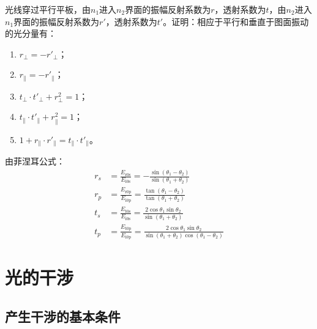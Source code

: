 \documentclass[cn,10pt,chinesefont=founder,math=mtpro2,cite=super,toc=onecol,twoside]{elegantbook}
\begin{document}
\begin{problem}
	光线穿过平行平板，由$n_1$进入$n_2$界面的振幅反射系数为$r$，透射系数为$t$，由$n_2$进入$n_1$界面的振幅反射系数为$r'$，透射系数为$t'$。证明：相应于平行和垂直于图面振动的光分量有：
	\begin{enumerate}
		\item $r_{\perp}=-r'_{\perp}$；
		\item $r_{\parallel}=-r'_{\parallel}$；
		\item $t_{\perp}\cdot t'_{\perp}+r^2_{\perp}=1$；
		\item $t_{\parallel}\cdot t'_{\parallel}+r^2_{\parallel}=1$；
		\item $1+r_{\parallel}\cdot r'_{\parallel}=t_{\parallel}\cdot t'_{\parallel}$。
	\end{enumerate}
\end{problem}
\begin{solution}
由菲涅耳公式：
\begin{equation}
\begin{aligned}
r_s&=\frac{E_{\mathrm{r0s}}}{E_{\mathrm{i0s}}}=-\frac{\sin(\theta_1-\theta_2)}{\sin(\theta_1+\theta_2)}\\ r_p&=\frac{E_{\mathrm{r0p}}}{E_{\mathrm{i0p}}}=\frac{\tan(\theta_1-\theta_2)}{\tan(\theta_1+\theta_2)}\\
t_s&=\frac{E_{\mathrm{t0s}}}{E_{\mathrm{i0s}}}=\frac{2\cos\theta_1\sin\theta_2}{\sin(\theta_1+\theta_2)}\\ t_p&=\frac{E_{\mathrm{t0p}}}{E_{\mathrm{i0p}}}=\frac{2\cos\theta_1\sin\theta_2}{\sin(\theta_1+\theta_2)\cos(\theta_1-\theta_2)}
\end{aligned}
\end{equation}
\end{solution}

\chapter{光的干涉}
\section{产生干涉的基本条件}
\end{document}
